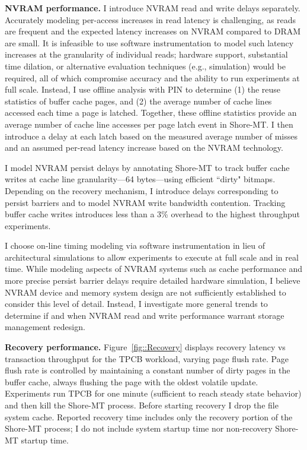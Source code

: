 \textbf{NVRAM performance.}
I introduce NVRAM read and write delays separately.
Accurately modeling per-access increases in read latency is challenging, as reads are frequent and the expected latency increases on NVRAM compared to DRAM are small.
It is infeasible to use software instrumentation to model such latency increases at the granularity of individual reads; hardware support, substantial time dilation, or alternative evaluation techniques (e.g., simulation) would be required, all of which compromise accuracy and the ability to run experiments at full scale.
Instead, I use offline analysis with PIN \cite{LukCohn05} to determine (1) the reuse statistics of buffer cache pages, and (2) the average number of cache lines accessed each time a page is latched.
Together, these offline statistics provide an average number of cache line accesses per page latch event in Shore-MT.
I then introduce a delay at each latch based on the measured average number of misses and an assumed per-read latency increase based on the NVRAM technology.

I model NVRAM persist delays by annotating Shore-MT to track buffer cache writes at cache line granularity---64 bytes---using efficient ``dirty" bitmaps.
Depending on the recovery mechanism, I introduce delays corresponding to persist barriers and to model NVRAM write bandwidth contention.
Tracking buffer cache writes introduces less than a 3\% overhead to the highest throughput experiments.

I choose on-line timing modeling via software instrumentation in lieu of architectural simulations to allow experiments to execute at full scale and in real time.
While modeling aspects of NVRAM systems such as cache performance and more precise persist barrier delays require detailed hardware simulation, I believe NVRAM device and memory system design are not sufficiently established to consider this level of detail.
Instead, I investigate more general trends to determine if and when NVRAM read and write performance warrant storage management redesign.

\textbf{Recovery performance.} Figure~\ref{fig::Recovery} displays recovery latency vs transaction throughput for the TPCB workload, varying page flush rate.
Page flush rate is controlled by maintaining a constant number of dirty pages in the buffer cache, always flushing the page with the oldest volatile update.
Experiments run TPCB for one minute (sufficient to reach steady state behavior) and then kill the Shore-MT process.
Before starting recovery I drop the file system cache.
Reported recovery time includes only the recovery portion of the Shore-MT process; I do not include system startup time nor non-recovery Shore-MT startup time.

